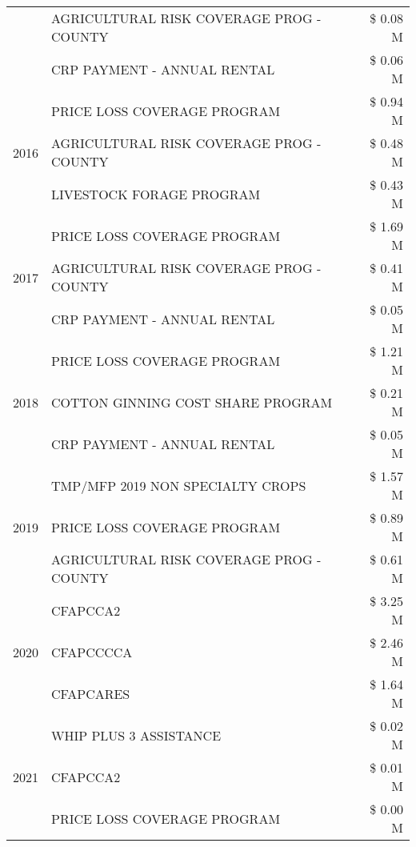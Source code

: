 \begin{tabular}{llr}
 & AGRICULTURAL RISK COVERAGE PROG - COUNTY & \$ 0.08 M \\
 & CRP PAYMENT - ANNUAL RENTAL & \$ 0.06 M \\
\cline{1-3}
\multirow[t]{3}{*}{2016} & PRICE LOSS COVERAGE PROGRAM & \$ 0.94 M \\
 & AGRICULTURAL RISK COVERAGE PROG - COUNTY & \$ 0.48 M \\
 & LIVESTOCK FORAGE PROGRAM & \$ 0.43 M \\
\cline{1-3}
\multirow[t]{3}{*}{2017} & PRICE LOSS COVERAGE PROGRAM & \$ 1.69 M \\
 & AGRICULTURAL RISK COVERAGE PROG - COUNTY & \$ 0.41 M \\
 & CRP PAYMENT - ANNUAL RENTAL & \$ 0.05 M \\
\cline{1-3}
\multirow[t]{3}{*}{2018} & PRICE LOSS COVERAGE PROGRAM & \$ 1.21 M \\
 & COTTON GINNING COST SHARE PROGRAM & \$ 0.21 M \\
 & CRP PAYMENT - ANNUAL RENTAL & \$ 0.05 M \\
\cline{1-3}
\multirow[t]{3}{*}{2019} & TMP/MFP 2019 NON SPECIALTY CROPS & \$ 1.57 M \\
 & PRICE LOSS COVERAGE PROGRAM & \$ 0.89 M \\
 & AGRICULTURAL RISK COVERAGE PROG - COUNTY & \$ 0.61 M \\
\cline{1-3}
\multirow[t]{3}{*}{2020} & CFAPCCA2 & \$ 3.25 M \\
 & CFAPCCCCA & \$ 2.46 M \\
 & CFAPCARES & \$ 1.64 M \\
\cline{1-3}
\multirow[t]{3}{*}{2021} & WHIP PLUS 3 ASSISTANCE & \$ 0.02 M \\
 & CFAPCCA2 & \$ 0.01 M \\
 & PRICE LOSS COVERAGE PROGRAM & \$ 0.00 M \\
\cline{1-3}
\bottomrule
\end{tabular}
